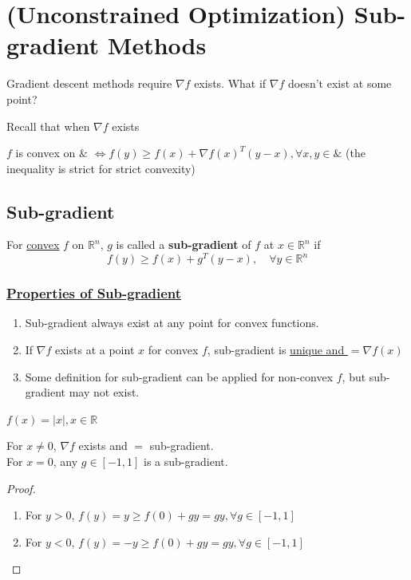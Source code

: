 \documentclass[11pt]{elegantbook}
\begin{document}
\chapter{(Unconstrained Optimization) Sub-gradient Methods}
Gradient descent methods require $\nabla f$ exists. What if $\nabla f$ doesn't exist at some point?

Recall that when $\nabla f$ exists

$f$ is convex on $\&$ $\Leftrightarrow f(y)\geq f(x)+\nabla f(x)^T(y-x),\forall x,y\in\&$ (the inequality is strict for strict convexity)
\section{Sub-gradient}
\begin{definition}
    For \underline{convex} $f$ on $\mathbb{R}^n$, $g$ is called a \textbf{sub-gradient} of $f$ at $x\in \mathbb{R}^n$ if $$f(y)\geq f(x)+g^T(y-x),\quad \forall y\in \mathbb{R}^n$$
\end{definition}
\subsection*{\underline{Properties of Sub-gradient}}
\begin{enumerate}[1)]
    \item Sub-gradient always exist at any point for convex functions.
    \item If $\nabla f$ exists at a point $x$ for convex $f$, sub-gradient is \underline{unique and $=\nabla f(x)$}
    \item Some definition for sub-gradient can be applied for non-convex $f$, but sub-gradient may not exist.
\end{enumerate}

\begin{example}
$f(x)=|x|,x\in \mathbb{R}$
\end{example}
For $x\neq 0$, $\nabla f$ exists and $=$ sub-gradient.\\
For $x=0$, any $g\in[-1,1]$ is a sub-gradient.
\begin{proof}\quad
\begin{enumerate}[(1)]
    \item For $y>0$, $f(y)=y\geq f(0)+gy=gy,\forall g\in[-1,1]$
    \item For $y<0$, $f(y)=-y\geq f(0)+gy=gy,\forall g\in[-1,1]$
\end{enumerate}
\end{proof}
\end{document}
